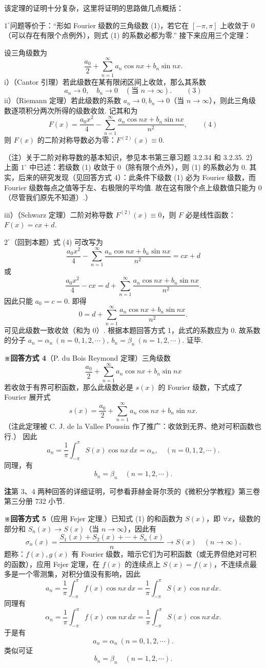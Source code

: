 \documentclass[UTF8,12pt,a4paper,fontset=fandol]{ctexart}
\begin{document}
该定理的证明十分复杂，这里将证明的思路做几点概括：

$1^\circ$\quad 问题等价于：``形如 Fourier 级数的三角级数 (1)，若它在 $[-\pi,\pi]$ 上收敛于 0（可以存在有限个点例外），则式 (1) 的系数必都为零.'' 接下来应用三个定理：

设三角级数为
\[
  \frac{a_0}{2}+\sum_{n=1}^{\infty}a_n\cos nx+b_n\sin nx.
\]
i）（Cantor 引理）若此级数在某有限闭区间上收敛，那么其系数
\[
  a_n\to0,\quad b_n\to0\quad(\text{当 }n\to\infty). \qquad(3)
\]
ii）（Riemann 定理）若此级数的系数 $a_n\to0,b_n\to0$（当 $n\to\infty$），则此三角级数逐项积分两次所得的级数收敛. 记其和为
\[
  F(x)=\frac{a_0x^2}{4}-\sum_{n=1}^{\infty}\frac{a_n\cos nx+b_n\sin nx}{n^2}, \qquad(4)
\]
则 $F(x)$ 的二阶对称导数必为零：$F^{(2)}(x)\equiv0$.

（注）关于二阶对称导数的基本知识，参见本书第三章习题 3.2.34 和 3.2.35. 2）上面 $1^\circ$ 中已述：若级数 (1) 收敛于 0（除有限个点外），则 (1) 的系数必为 0. 其实，后来的研究发现（见回答方式 4）：此条件下级数 (1) 必为 Fourier 级数，而 Fourier 级数每点之值等于左、右极限的平均值. 故在这有限个点上级数值只能为 0（尽管我们原先不知道）.）

iii）（Schwarz 定理）二阶对称导数 $F^{(2)}(x)\equiv0$，则 $F$ 必是线性函数：$F(x)=cx+d$.

$2^\circ$\quad （回到本题）式 (4) 可改写为
\[
  \frac{a_0x^2}{4}-\sum_{n=1}^{\infty}\frac{a_n\cos nx+b_n\sin nx}{n^2}=cx+d
\]
或
\[
  \frac{a_0x^2}{4}-cx=d+\sum_{n=1}^{\infty}\frac{a_n\cos nx+b_n\sin nx}{n^2}.
\]
因此只能 $a_0=c=0$. 即得
\[
  0=d+\sum_{n=1}^{\infty}\frac{a_n\cos nx+b_n\sin nx}{n^2}.
\]
可见此级数一致收敛（和为 0）. 根据本题回答方式 1，此式的系数应为 0. 故系数的分子
$a_n=\alpha_n\ (n=0,1,2,\cdots),\ b_n=\beta_n\ (n=1,2,\cdots)$. 证毕.

\noindent\textbf{※回答方式 4}\quad （P. du Bois Reymond 定理）三角级数
\[
  \frac{a_0}{2}+\sum_{n=1}^{\infty}a_n\cos nx+b_n\sin nx
\]
若收敛于有界可积函数，那么此级数必是 $s(x)$ 的 Fourier 级数，下式成了 Fourier 展开式
\[
  s(x)=\frac{a_0}{2}+\sum_{n=1}^{\infty}a_n\cos nx+b_n\sin nx.
\]
（注\quad 此定理被 C. J. de la Vallee Poussin 作了推广：收敛到无界、绝对可积函数也行.）
因此
\[
  a_n=\frac1\pi\int_{-\pi}^{\pi}S(x)\cos nx\,dx=\alpha_n,\quad(n=0,1,2,\cdots).
\]
同理，有
\[
  b_n=\beta_n\quad(n=1,2,\cdots).
\]

\noindent\textbf{注}\quad 第 3、4 两种回答的详细证明，可参看菲赫金哥尔茨的《微积分学教程》第三卷第三分册 732 小节.

\noindent\textbf{※回答方式 5}\quad （应用 Fejer 定理.）已知式 (1) 的和函数为 $S(x)$，即 $\forall x$，级数的部分和
$S_n(x)\to S(x)$（当 $n\to\infty$），因此有
\[
  \sigma_n(x)=\frac{S_1(x)+S_2(x)+\cdots+S_n(x)}{n}\to S(x)\quad(n\to\infty).
\]
题称：$f(x),g(x)$ 有 Fourier 级数，暗示它们为可积函数（或无界但绝对可积的函数），应用 Fejer 定理，在
$f(x)$ 的连续点上 $S(x)=f(x)$，不连续点最多是一个零测集，对积分值没有影响，因此
\[
  a_n=\frac1\pi\int_{-\pi}^{\pi}f(x)\cos nx\,dx
  =\frac1\pi\int_{-\pi}^{\pi}S(x)\cos nx\,dx.
\]
同理有
\[
  \alpha_n=\frac1\pi\int_{-\pi}^{\pi}f(x)\cos nx\,dx
  =\frac1\pi\int_{-\pi}^{\pi}S(x)\cos nx\,dx.
\]
于是有
\[
  a_n=\alpha_n\ (n=0,1,2,\cdots).
\]
类似可证
\[
  b_n=\beta_n\quad(n=1,2,\cdots).
\]
\end{document}
